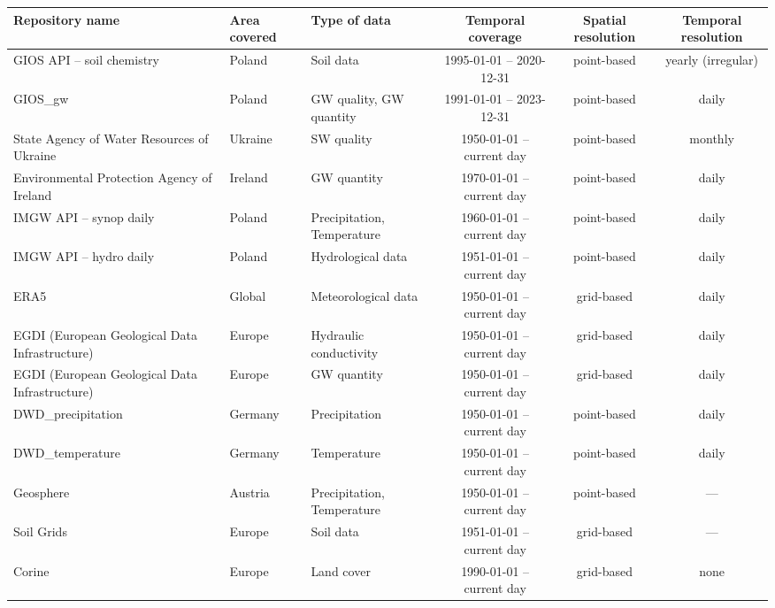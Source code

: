 \documentclass[preprint,12pt,authoryear]{elsarticle}
\begin{document}
\begin{table}
    \centering
    \small
    \setlength{\tabcolsep}{5pt}
    \begin{tabularx}{\textwidth}{@{} >{\raggedright\arraybackslash}X l >{\raggedright\arraybackslash}X c c c @{}}
    \toprule
        \textbf{Repository name} & \textbf{Area covered} & \textbf{Type of data} & \textbf{Temporal coverage} & \textbf{Spatial resolution} & \textbf{Temporal resolution} \\ \midrule
        GIOS API – soil chemistry & Poland & Soil data & 1995-01-01 – 2020-12-31 & point-based & yearly (irregular) \\
        GIOS\_gw & Poland & GW quality, GW quantity & 1991-01-01 – 2023-12-31 & point-based & daily \\
        State Agency of Water Resources of Ukraine & Ukraine & SW quality & 1950-01-01 – current day & point-based & monthly \\
        Environmental Protection Agency of Ireland & Ireland & GW quantity & 1970-01-01 – current day & point-based & daily \\
        IMGW API – synop daily & Poland & Precipitation, Temperature & 1960-01-01 – current day & point-based & daily \\
        IMGW API – hydro daily & Poland & Hydrological data & 1951-01-01 – current day & point-based & daily \\
        ERA5 & Global & Meteorological data & 1950-01-01 – current day & grid-based & daily \\
        EGDI (European Geological Data Infrastructure) & Europe & Hydraulic conductivity & 1950-01-01 – current day & grid-based & daily \\
        EGDI (European Geological Data Infrastructure) & Europe & GW quantity & 1950-01-01 – current day & grid-based & daily \\
        DWD\_precipitation & Germany & Precipitation & 1950-01-01 – current day & point-based & daily \\
        DWD\_temperature & Germany & Temperature & 1950-01-01 – current day & point-based & daily \\
        Geosphere & Austria & Precipitation, Temperature & 1950-01-01 – current day & point-based & — \\
        Soil Grids & Europe & Soil data & 1951-01-01 – current day & grid-based & — \\
        Corine & Europe & Land cover & 1990-01-01 – current day & grid-based & none \\

\end{tabularx}
\end{table}
\end{document}
